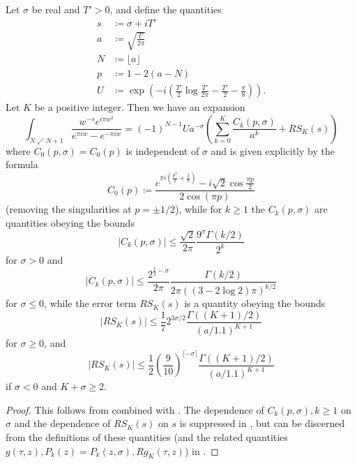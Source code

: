\begin{proposition}\label{arias-prop}  Let $\sigma$ be real and $T'>0$, and define the quantities
\begin{align}
s &\coloneqq \sigma + iT' \label{s-def}\\
a &\coloneqq \sqrt{\frac{T'}{2\pi}} \label{a-def}\\
N &\coloneqq \lfloor a \rfloor \label{N-def}\\
p &\coloneqq 1 - 2(a-N) \label{p-def}\\
U &\coloneqq \exp\left( -i\left(\frac{T'}{2} \log \frac{T'}{2\pi} - \frac{T'}{2} - \frac{\pi}{8}\right) \right)\label{U-def}.
\end{align}
Let $K$ be a positive integer.  Then we have an expansion
$$ \int_{N \swarrow N+1} \frac{w^{-s} e^{i\pi w^2}}{e^{\pi i w} - e^{-\pi i w}} = (-1)^{N-1} U a^{-\sigma} \left(\sum_{k=0}^K \frac{C_k(p,\sigma)}{a^k} + RS_K(s)\right) $$
where $C_0(p,\sigma) = C_0(p)$ is independent of $\sigma$ and is given explicitly by the formula
\begin{equation}\label{C0-def}
C_0(p) \coloneqq \frac{e^{\pi i (\frac{p^2}{2} +\frac{3}{8})} - i \sqrt{2} \cos \frac{\pi p}{2}}{2 \cos(\pi p)}
\end{equation}
(removing the singularities at $p = \pm 1/2$), while for $k \geq 1$ the $C_k(p,\sigma)$ are quantities obeying the bounds
\begin{equation}\label{ck-bound-1}
|C_k(p,\sigma)| \leq \frac{\sqrt{2}}{2\pi} \frac{9^\sigma \Gamma(k/2)}{2^k}
\end{equation}
for $\sigma>0$ and
\begin{equation}\label{ck-bound-2}
|C_k(p,\sigma)| \leq \frac{2^{\frac{1}{2}-\sigma}}{2\pi} \frac{\Gamma(k/2)}{2\pi ((3-2\log 2)\pi)^{k/2}}
\end{equation}
for $\sigma \leq 0$, while the error term $RS_K(s)$ is a quantity obeying the bounds
\begin{equation}\label{rsk-bound-1}
|RS_K(s)| \leq \frac{1}{7} 2^{3\sigma/2} \frac{\Gamma((K+1)/2)}{(a/1.1)^{K+1}}
\end{equation}
for $\sigma \geq 0$, and
\begin{equation}\label{rsk-bound-2}
|RS_K(s)| \leq \frac{1}{2} \left(\frac{9}{10}\right)^{\lceil -\sigma \rceil} \frac{\Gamma((K+1)/2)}{(a/1.1)^{K+1}}
\end{equation}
if $\sigma < 0$ and $K + \sigma \geq 2$.
\end{proposition}

\begin{proof} This follows from \cite[Theorems 3.1, 4.1, 4.2]{arias} combined with \cite[(3.2), (5.2)]{arias}.  The dependence of $C_k(p,\sigma), k \geq 1$ on $\sigma$ and the dependence of $RS_K(s)$ on $s$ is suppressed in \cite{arias}, but can be discerned from the definitions of these quantities (and the related quantities $g(\tau,z), P_k(z) = P_k(z,\sigma), Rg_K(\tau,z)$) in \cite[(3.9), (3.10), (3.7), (3.6)]{arias}.
\end{proof}

